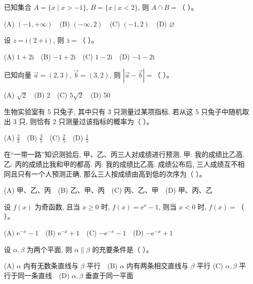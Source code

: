 \begin{question}
已知集合 $A = \{x \mid x > -1\}$, $B = \{x \mid x < 2\}$, 则 $A \cap B =$（ ）。

(A) $(-1, +\infty)$　(B) $(-\infty, 2)$　(C) $(-1, 2)$　(D) $\varnothing$

\end{question}
\begin{question}
设 $z = \mathrm{i}(2 + \mathrm{i})$, 则 $\bar{z} =$（ ）。

(A) $1 + 2\mathrm{i}$　(B) $-1 + 2\mathrm{i}$　(C) $1 - 2\mathrm{i}$　(D) $-1 - 2\mathrm{i}$

\end{question}
\begin{question}
已知向量 $\vec{a} = (2, 3)$, $\vec{b} = (3, 2)$, 则 $|\vec{a} - \vec{b}| =$（ ）。

(A) $\sqrt{2}$　(B) 2　(C) $5\sqrt{2}$　(D) 50

\end{question}
\begin{question}
生物实验室有 5 只兔子, 其中只有 3 只测量过某项指标, 若从这 5 只兔子中随机取出 3 只, 则恰有 2 只测量过该指标的概率为（ ）。

(A) $\frac{2}{3}$　(B) $\frac{3}{5}$　(C) $\frac{2}{5}$　(D) $\frac{1}{5}$

\end{question}
\begin{question}
在“一带一路”知识测验后, 甲、乙、丙三人对成绩进行预测.
甲: 我的成绩比乙高.
乙: 丙的成绩比我和甲的都高.
丙: 我的成绩比乙高.
成绩公布后, 三人成绩互不相同且只有一个人预测正确, 那么三人按成绩由高到低的次序为（ ）。

(A) 甲、乙、丙　(B) 乙、甲、丙　(C) 丙、乙、甲　(D) 甲、丙、乙

\end{question}
\begin{question}
设 $f(x)$ 为奇函数, 且当 $x \geqslant 0$ 时, $f(x) = \mathrm{e}^x - 1$, 则当 $x < 0$ 时, $f(x) =$（ ）。

(A) $\mathrm{e}^{-x} - 1$　(B) $\mathrm{e}^{-x} + 1$　(C) $-\mathrm{e}^{-x} - 1$　(D) $-\mathrm{e}^{-x} + 1$

\end{question}
\begin{question}
设 $\alpha, \beta$ 为两个平面, 则 $\alpha \parallel \beta$ 的充要条件是（ ）。

(A) $\alpha$ 内有无数条直线与 $\beta$ 平行　(B) $\alpha$ 内有两条相交直线与 $\beta$ 平行
(C) $\alpha, \beta$ 平行于同一条直线　(D) $\alpha, \beta$ 垂直于同一平面

\end{question}
